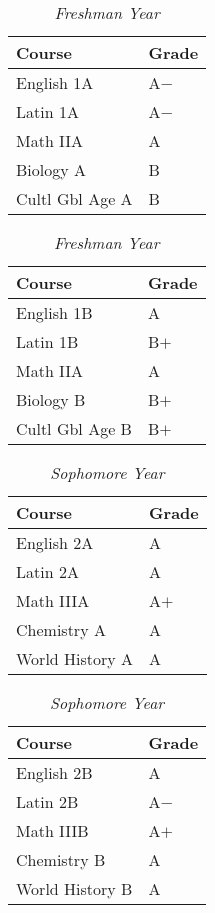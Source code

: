 \documentclass[12pt]{article}
\renewcommand{\it}[1]{\textit{{#1}}}
\begin{document}
\begin{table}[H]
    \centering
    \caption*{\it{Freshman Year}}
    \vspace{-0.8em}
    \begin{tabular}{l|l}
        Course          & Grade \\
        \hline
        English 1A      & A$-$  \\
        Latin 1A        & A$-$  \\
        Math IIA        & A     \\
        Biology A       & B     \\
        Cultl Gbl Age A & B     \\
    \end{tabular}
    \hspace{2em}
    \begin{tabular}{l|l}
        Course          & Grade \\
        \hline
        English 1B      & A     \\
        Latin 1B        & B$+$  \\
        Math IIA        & A     \\
        Biology B       & B$+$  \\
        Cultl Gbl Age B & B$+$  \\
    \end{tabular}
    \vspace{-1em}
\end{table}

\begin{table}[H]
    \centering
    \caption*{\it{Sophomore Year}}
    \vspace{-0.8em}
    \begin{tabular}{l|l}
        Course          & Grade \\
        \hline
        English 2A      & A     \\
        Latin 2A        & A     \\
        Math IIIA       & A$+$  \\
        Chemistry A     & A     \\
        World History A & A     \\
    \end{tabular}
    \hspace{2em}
    \begin{tabular}{l|l}
        Course          & Grade \\
        \hline
        English 2B      & A     \\
        Latin 2B        & A$-$  \\
        Math IIIB       & A$+$  \\
        Chemistry B     & A     \\
        World History B & A     \\
    \end{tabular}
    \vspace{-1em}
\end{table}
\end{document}
